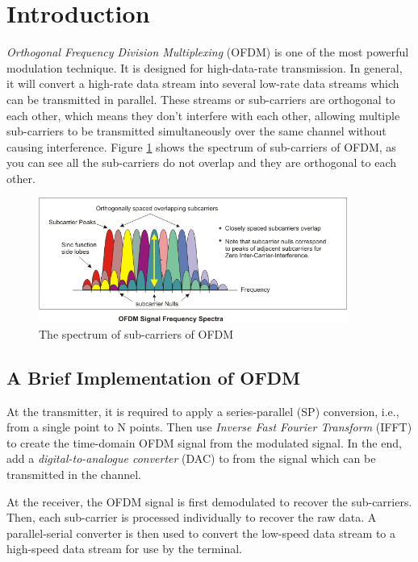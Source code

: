 \documentclass{article}
\numberwithin{figure}{section}
\numberwithin{equation}{section}
\begin{document}
\pagestyle{plain}
\setcounter{page}{1}

\section{Introduction}
\textit{Orthogonal Frequency Division Multiplexing} (OFDM) is one of the most powerful modulation technique. It is designed for high-data-rate transmission. In general, it will convert a high-rate data stream into several low-rate data streams which can be transmitted in parallel\cite{RN79}. These streams or sub-carriers are orthogonal to each other, which means they don't interfere with each other, allowing multiple sub-carriers to be transmitted simultaneously over the same channel without causing interference. Figure \ref{fig:subcarriers} shows the spectrum of sub-carriers of OFDM, as you can see all the sub-carriers do not overlap and they are orthogonal to each other.\cite{RN80}

\begin{figure}[!ht]
    \centering
    \includegraphics[width=0.9\textwidth]{images/subcarriers.png}
    \caption{\label{fig:subcarriers}The spectrum of sub-carriers of OFDM}
\end{figure}

\subsection{A Brief Implementation of OFDM}
At the transmitter, it is required to apply a series-parallel (SP) conversion, i.e., from a single point to N points. Then use \textit{Inverse Fast Fourier Transform} (IFFT) to create the time-domain OFDM signal from the modulated signal. In the end, add a \textit{digital-to-analogue converter} (DAC) to from the signal which can be transmitted in the channel.

At the receiver, the OFDM signal is first demodulated to recover the sub-carriers. Then, each sub-carrier is processed individually to recover the raw data. A parallel-serial converter is then used to convert the low-speed data stream to a high-speed data stream for use by the terminal.
\end{document}
